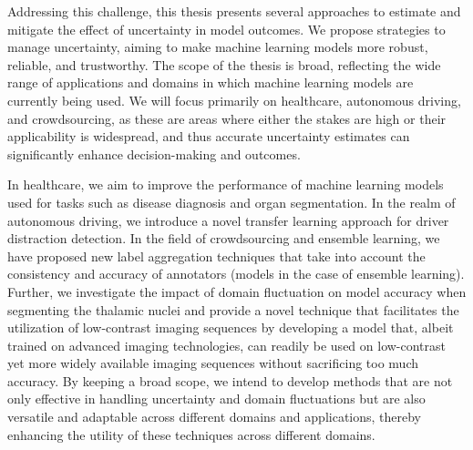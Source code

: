 Addressing this challenge, this thesis presents several approaches to estimate and mitigate the effect of uncertainty in model outcomes. We propose strategies to manage uncertainty, aiming to make machine learning models more robust, reliable, and trustworthy. The scope of the thesis is broad, reflecting the wide range of applications and domains in which machine learning models are currently being used. We will focus primarily on healthcare, autonomous driving, and crowdsourcing, as these are areas where either the stakes are high or their applicability is widespread, and thus accurate uncertainty estimates can significantly enhance decision-making and outcomes.

In healthcare, we aim to improve the performance of machine learning models used for tasks such as disease diagnosis and organ segmentation. In the realm of autonomous driving, we introduce a novel transfer learning approach for driver distraction detection. In the field of crowdsourcing and ensemble learning, we have proposed new label aggregation techniques that take into account the consistency and accuracy of annotators (models in the case of ensemble learning). Further, we investigate the impact of domain fluctuation on model accuracy when segmenting the thalamic nuclei and provide a novel technique that facilitates the utilization of low-contrast imaging sequences by developing a model that, albeit trained on advanced imaging technologies,  can readily be used on low-contrast yet more widely available imaging sequences without sacrificing too much accuracy.
By keeping a broad scope, we intend to develop methods that are not only effective in handling uncertainty and domain fluctuations but are also versatile and adaptable across different domains and applications, thereby enhancing the utility of these techniques across different domains.

